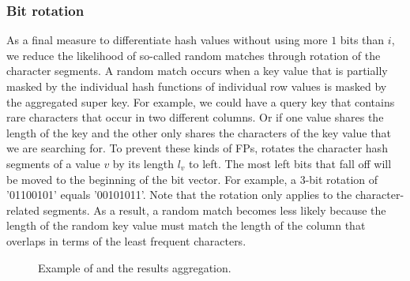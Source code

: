 \subsubsection{Bit rotation}\label{subsubsec:bitrotation}
As a final measure to differentiate hash values without using more $1$ bits than $i$, we reduce the likelihood of so-called random matches through rotation of the character segments.
A random match occurs when a key value that is partially masked by the individual hash functions of individual row values is masked by the aggregated super key.
For example, we could have a query key that contains rare characters that occur in two different columns. Or if one value shares the length of the key and the other only shares the characters of the key value that we are searching for.
To prevent these kinds of FPs, \hash rotates the character hash segments of a value $v$ by its length $l_v$ to left.
The most left bits that fall off will be moved to the beginning of the bit vector.
For example, a 3-bit rotation of '01100101' equals '00101011'. Note that the rotation only applies to the character-related segments.
As a result, a random match becomes less likely because the length of the random key value must match the length of the column that overlaps in terms of the least frequent characters.

\begin{figure}
    \caption{Example of \hash and the results aggregation.}
    \label{fig:hash_array_example}
\end{figure}


